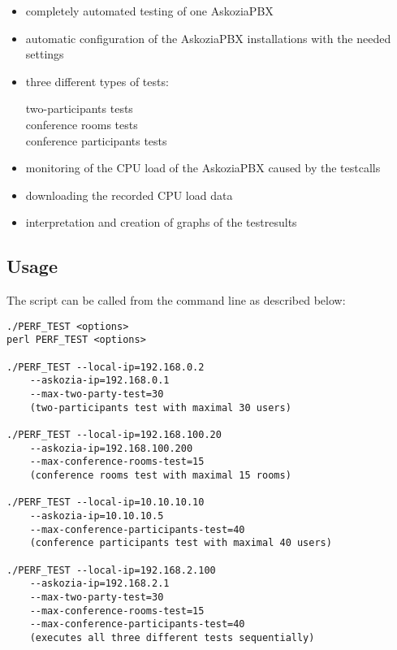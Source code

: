 \begin{itemize}
\item completely automated testing of one AskoziaPBX
\item automatic configuration of the AskoziaPBX installations with the needed settings
\item three different types of tests:
	\begin{description}
	\item [two-participants tests] %
	
	\item [conference rooms tests] %

	\item [conference participants tests] %
	\end{description}
	
\item monitoring of the CPU load of the AskoziaPBX caused by the testcalls
\item downloading the recorded CPU load data
\item interpretation and creation of graphs of the testresults 
\end{itemize}

\newpage
\subsection{Usage}%
The script can be called from the command line as described below: 

\begin{lstlisting}[breaklines=true,label=code:script-usage,caption={Script usage} ]
./PERF_TEST <options>
perl PERF_TEST <options>

./PERF_TEST --local-ip=192.168.0.2
    --askozia-ip=192.168.0.1
    --max-two-party-test=30
    (two-participants test with maximal 30 users)

./PERF_TEST --local-ip=192.168.100.20
    --askozia-ip=192.168.100.200
    --max-conference-rooms-test=15
    (conference rooms test with maximal 15 rooms)

./PERF_TEST --local-ip=10.10.10.10
    --askozia-ip=10.10.10.5
    --max-conference-participants-test=40
    (conference participants test with maximal 40 users)

./PERF_TEST --local-ip=192.168.2.100
    --askozia-ip=192.168.2.1
    --max-two-party-test=30
    --max-conference-rooms-test=15
    --max-conference-participants-test=40
    (executes all three different tests sequentially)
\end{lstlisting}

